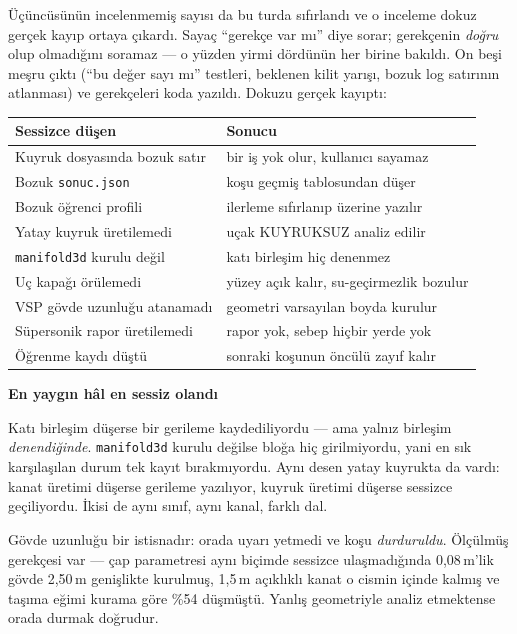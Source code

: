 \documentclass[11pt,a4paper]{article}
\newcommand{\kkkenar}{lacivert}
\newcommand{\kkzemin}{kod}
\newenvironment{renkkutu}[3]{%
  \renewcommand{\kkkenar}{#1}\renewcommand{\kkzemin}{#2}%
  \par\medskip\noindent
  \begin{lrbox}{\kutugovde}%
  \begin{minipage}{\dimexpr\linewidth-2\fboxsep-2\fboxrule\relax}\footnotesize
  \textcolor{#1}{\textbf{#3}}\par\vspace{3pt}%
}{%
  \end{minipage}%
  \end{lrbox}%
  \noindent\fcolorbox{\kkkenar}{\kkzemin}{\usebox{\kutugovde}}%
  \par\medskip
}
\newenvironment{reddedilir}[1]{\begin{renkkutu}{kotu}{kotubg}{#1}}{\end{renkkutu}}
\begin{document}
Üçüncüsünün incelenmemiş sayısı da bu turda sıfırlandı ve o inceleme dokuz
gerçek kayıp ortaya çıkardı. Sayaç ``gerekçe var mı'' diye sorar; gerekçenin
\emph{doğru} olup olmadığını soramaz --- o yüzden yirmi dördünün her birine
bakıldı. On beşi meşru çıktı (``bu değer sayı mı'' testleri, beklenen kilit
yarışı, bozuk log satırının atlanması) ve gerekçeleri koda yazıldı. Dokuzu
gerçek kayıptı:

\begin{center}\footnotesize
\begin{tabular}{@{}ll@{}}
\toprule
\textbf{Sessizce düşen} & \textbf{Sonucu} \\
\midrule
Kuyruk dosyasında bozuk satır & bir iş yok olur, kullanıcı sayamaz \\
Bozuk \texttt{sonuc.json} & koşu geçmiş tablosundan düşer \\
Bozuk öğrenci profili & ilerleme sıfırlanıp üzerine yazılır \\
Yatay kuyruk üretilemedi & uçak KUYRUKSUZ analiz edilir \\
\texttt{manifold3d} kurulu değil & katı birleşim hiç denenmez \\
Uç kapağı örülemedi & yüzey açık kalır, su-geçirmezlik bozulur \\
VSP gövde uzunluğu atanamadı & geometri varsayılan boyda kurulur \\
Süpersonik rapor üretilemedi & rapor yok, sebep hiçbir yerde yok \\
Öğrenme kaydı düştü & sonraki koşunun öncülü zayıf kalır \\
\bottomrule
\end{tabular}
\end{center}

\begin{reddedilir}{En yaygın hâl en sessiz olandı}
Katı birleşim düşerse bir gerileme kaydediliyordu --- ama yalnız birleşim
\emph{denendiğinde}. \texttt{manifold3d} kurulu değilse bloğa hiç girilmiyordu,
yani en sık karşılaşılan durum tek kayıt bırakmıyordu. Aynı desen yatay
kuyrukta da vardı: kanat üretimi düşerse gerileme yazılıyor, kuyruk üretimi
düşerse sessizce geçiliyordu. İkisi de aynı sınıf, aynı kanal, farklı dal.
\end{reddedilir}

\noindent Gövde uzunluğu bir istisnadır: orada uyarı yetmedi ve koşu
\emph{durduruldu}. Ölçülmüş gerekçesi var --- çap parametresi aynı biçimde
sessizce ulaşmadığında 0{,}08\,m'lik gövde 2{,}50\,m genişlikte kurulmuş, 1{,}5\,m
açıklıklı kanat o cismin içinde kalmış ve taşıma eğimi kurama göre \%54
düşmüştü. Yanlış geometriyle analiz etmektense orada durmak doğrudur.
\end{document}

